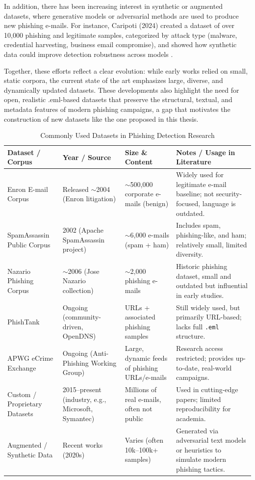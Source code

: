 In addition, there has been increasing interest in synthetic or augmented datasets, where generative models or adversarial methods are used to produce new phishing e-mails. For instance, Caripoti (2024) created a dataset of over 10,000 phishing and legitimate samples, categorized by attack type (malware, credential harvesting, business email compromise), and showed how synthetic data could improve detection robustness across models \cite{caripoti2024synthetic}.

Together, these efforts reflect a clear evolution: while early works relied on small, static corpora, the current state of the art emphasizes large, diverse, and dynamically updated datasets. These developments also highlight the need for open, realistic .eml-based datasets that preserve the structural, textual, and metadata features of modern phishing campaigns, a gap that motivates the construction of new datasets like the one proposed in this thesis.

\begin{table}[ht]
\centering
\caption{Commonly Used Datasets in Phishing Detection Research}
\label{tab:phishing_datasets}
\begin{tabular}{|p{3cm}|p{3cm}|p{4cm}|p{5cm}|}
\hline
\textbf{Dataset / Corpus} & \textbf{Year / Source} & \textbf{Size \& Content} & \textbf{Notes / Usage in Literature} \\ \hline
Enron E-mail Corpus & Released $\sim$2004 (Enron litigation) & $\sim$500,000 corporate e-mails (benign) & Widely used for legitimate e-mail baseline; not security-focused, language is outdated. \\ \hline
SpamAssassin Public Corpus & 2002 (Apache SpamAssassin project) & $\sim$6,000 e-mails (spam + ham) & Includes spam, phishing-like, and ham; relatively small, limited diversity. \\ \hline
Nazario Phishing Corpus & $\sim$2006 (Jose Nazario collection) & $\sim$2,000 phishing e-mails & Historic phishing dataset, small and outdated but influential in early studies. \\ \hline
PhishTank & Ongoing (community-driven, OpenDNS) & URLs + associated phishing samples & Still widely used, but primarily URL-based; lacks full \texttt{.eml} structure. \\ \hline
APWG eCrime Exchange & Ongoing (Anti-Phishing Working Group) & Large, dynamic feeds of phishing URLs/e-mails & Research access restricted; provides up-to-date, real-world campaigns. \\ \hline
Custom / Proprietary Datasets & 2015--present (industry, e.g., Microsoft, Symantec) & Millions of real e-mails, often not public & Used in cutting-edge papers; limited reproducibility for academia. \\ \hline
Augmented / Synthetic Data & Recent works (2020s) & Varies (often 10k--100k+ samples) & Generated via adversarial text models or heuristics to simulate modern phishing tactics. \\ \hline
\end{tabular}
\end{table}
